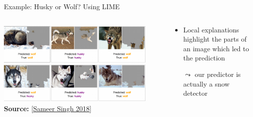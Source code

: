 \documentclass[11pt,compress,t,notes=noshow, aspectratio=169, xcolor=table]{beamer}
\begin{document}
\begin{vbframe}[c]{Example: Husky or Wolf? Using LIME}

	\begin{columns}
	
	\begin{column}{0.7\textwidth}
	    
	\begin{center}
		\includegraphics[width=0.9\textwidth]{figure/lime-wolfhusky3.png}\\
		{\textbf{Source:} [\href{http://www.facweb.iitkgp.ac.in/~niloy/COURSE/Spring2018/IntelligentSystem/PPT_2018/why_should_i_trust_ppt.pdf}{Sameer Singh 2018}]}
	\end{center}
	    
	\end{column}
	
	\begin{column}{0.3\textwidth}
	    
	\begin{itemize}
		\item Local explanations highlight the parts of an image which led to the prediction
		\item[$\leadsto$] our predictor is actually a snow detector 
	\end{itemize}
	    
	\end{column}
	    
	\end{columns}







\end{vbframe}
\end{document}

